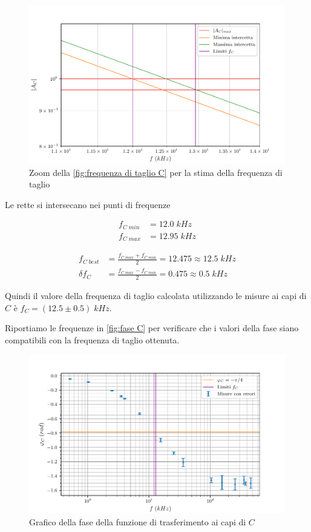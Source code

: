 \documentclass[11pt, a4paper]{article}
\numberwithin{equation}{section} %
\begin{document}
\begin{figure}[ht!]
    \includegraphics{onda_sin_AC(f)_taglio_frequenza.pdf}
    \caption{Zoom della \autoref{fig:frequenza di taglio C} per la stima della frequenza di taglio}
    \label{fig:frequenza di taglio C zoom}
\end{figure}

\newpage

Le rette si intersecano nei punti di frequenze

\begin{align*}
    f_{C \; min} &= 12.0 \; kHz \\
    f_{C \; max} &= 12.95 \; kHz
\end{align*}

\begin{align*}
    f_{C \; best} &= \frac{f_{C \; max} + f_{C \; min}}{2} = 12.475 \approx 12.5 \; kHz \\
    \delta f_{C} &= \frac{f_{C \; max} - f_{C \; min}}{2} = 0.475 \approx 0.5 \; kHz
\end{align*}

Quindi il valore della frequenza di taglio calcolata utilizzando le misure ai capi di $C$ è \(f_{C} = (12.5 \pm 0.5) \; kHz\).

Riportiamo le frequenze in \autoref{fig:fase C} per verificare che i valori della fase siano compatibili con la frequenza di taglio ottenuta.

\begin{figure}[ht!]
    \includegraphics{onda_sin_phi(f)_C.pdf}
    \caption{Grafico della fase della funzione di trasferimento ai capi di $C$}
    \label{fig:fase C}
\end{figure}
\end{document}
